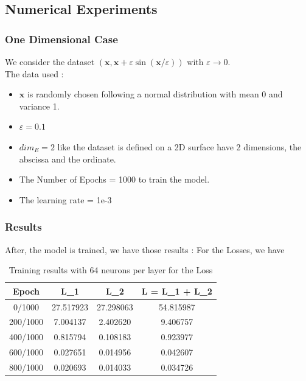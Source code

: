 \documentclass{report}
\begin{document}
    \subsection{Numerical Experiments}
        \subsubsection{One Dimensional Case}
            We consider the dataset $(\mathbf{x}, \mathbf{x}+\varepsilon \sin (\mathbf{x} / \varepsilon))$ with $\varepsilon \rightarrow 0$.
            \\
            The data used :
            \begin{itemize}
                \item $\mathbf{x}$ is randomly chosen following a normal distribution with mean 0 and variance 1.
                \item $\varepsilon = 0.1$
                \item  $dim_E = 2$ like the dataset is defined on a 2D 
                        surface have 2 dimensions, the abscissa and the ordinate.
                \item The Number of Epochs = 1000  to train the model.
                \item The learning rate = 1e-3
            \end{itemize}
        \subsubsection{Results}
            After, the model is trained, we have those results :
            For the Losses, we have 
            \begin{table}[h]
                \centering
                \begin{tabular}{|c|c|c|c|}
                \hline
                Epoch & L_{1} & L_{2} & L = L_{1} + L_{2} \\
                \hline
                0/1000 & 27.517923 & 27.298063 & 54.815987 \\
                200/1000 & 7.004137 & 2.402620 & 9.406757 \\
                400/1000 & 0.815794 & 0.108183 & 0.923977 \\
                600/1000 & 0.027651 & 0.014956 & 0.042607 \\
                800/1000 & 0.020693 & 0.014033 & 0.034726 \\
                \hline
                \end{tabular}
                \caption{Training results with 64 neurons per layer for the Loss}

            \end{table}
\end{document}
